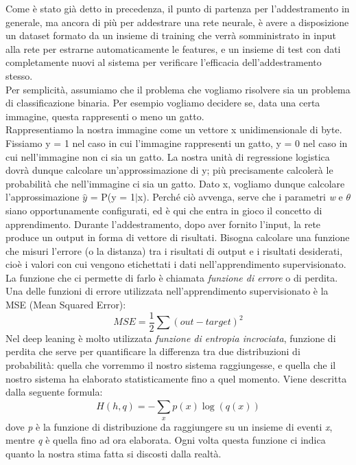 Come è stato già detto in precedenza, il punto di partenza per l’addestramento in generale, ma ancora di più per addestrare una rete neurale, 
è avere a disposizione un dataset formato da un insieme di training che verrà somministrato in
 input alla rete per estrarne automaticamente le features, e un insieme di test con dati completamente nuovi al sistema
  per verificare l'efficacia dell’addestramento stesso. \\
  Per semplicità, assumiamo che il problema che vogliamo risolvere sia un problema di classificazione binaria. Per esempio vogliamo decidere se, data una certa
immagine, questa rappresenti o meno un gatto.\\
Rappresentiamo la nostra immagine come un vettore x unidimensionale di byte.
Fissiamo y = 1 nel caso in cui l’immagine rappresenti un gatto, y = 0 nel caso in
cui nell’immagine non ci sia un gatto. La nostra unità di regressione logistica dovrà
dunque calcolare un’approssimazione di y; più precisamente calcolerà le probabilità
che nell’immagine ci sia un gatto.
Dato x, vogliamo dunque calcolare l'approssimazione 
$\hat{y}$ = P(y = 1$\mid$x). 
Perché ciò avvenga, serve che i parametri \emph{w} e \(\theta\) siano opportunamente configurati, 
ed è qui che entra in gioco il concetto di apprendimento.
  Durante l’addestramento, dopo aver fornito l'input,
   la rete produce un output in forma di
vettore di risultati. Bisogna calcolare una funzione che misuri l’errore (o la distanza) tra i
 risultati di output e i risultati desiderati, cioè i valori con cui vengono etichettati i 
 dati nell’apprendimento supervisionato.\\
  La funzione che ci permette di farlo è chiamata \emph{funzione di errore} o di perdita.
   Una delle funzioni di errore utilizzata nell’apprendimento supervisionato è la MSE 
   (Mean Squared Error):
   \begin{equation} \label{2}
MSE = \frac{1}{2}\sum (out - target)^{2}
   \end{equation}
 Nel deep leaning è molto utilizzata \emph{funzione di entropia incrociata}, 
funzione di perdita che serve per quantificare la differenza tra due distribuzioni di 
probabilità:
 quella che vorremmo il nostro sistema raggiungesse, e quella che il nostro sistema ha elaborato statisticamente
 fino a quel momento. Viene descritta dalla seguente formula:
 \[ H(h,q) = -\sum_{x}^{}p(x) \log (q(x))\] 
 dove \emph{p} è la funzione di distribuzione da raggiungere su un insieme di eventi \emph{x}, mentre \emph{q} 
 è quella fino ad ora elaborata. 
 Ogni volta questa funzione ci indica quanto la nostra stima fatta si discosti dalla realtà.\\

